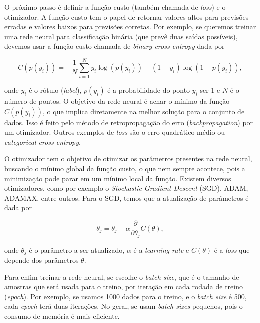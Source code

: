 \documentclass[a4paper,12pt,oneside]{book}
\begin{document}
\par O próximo passo é definir a função custo (também chamada de \textit{loss}) e o otimizador. A função custo tem o papel de retornar valores altos para previsões erradas e valores baixos para previsões corretas. Por exemplo, se queremos treinar uma rede neural para classificação binária (que prevê duas saídas possíveis), devemos usar a função custo chamada de \textit{binary cross-entropy} dada por\cite{dl_book}

\begin{equation}\label{eq:binary_cross_entropy}
    C(p(y_i)) = -\frac{1}{N}\sum_{i = 1} ^N y_i \log(p(y_i)) + (1 - y_i)\log(1 - p(y_i)),
\end{equation}

\par onde $y_i$ é o rótulo (\textit{label}), $p(y_i)$ é a probabilidade do ponto $y_i$ ser 1 e $N$ é o número de pontos. O objetivo da rede neural é achar o mínimo da função $C(p(y_i))$, o que implica diretamente na melhor solução para o conjunto de dados. Isso é feito pelo método de retropropagação do erro (\textit{backpropagation}\cite{backpropagation}) por um otimizador. Outros exemplos de \textit{loss} são o erro quadrático médio ou \textit{categorical cross-entropy}\cite{MSE_CEF_review}.

\par O otimizador tem o objetivo de otimizar os parâmetros presentes na rede neural, buscando o mínimo global da função custo, o que nem sempre acontece, pois a minimização pode parar em um mínimo local da função. Existem diversos otimizadores, como por exemplo o \textit{Stochastic Gradient Descent} (SGD), ADAM, ADAMAX\cite{ADAMAX}, entre outros\cite{gradient_over}. Para o SGD, temos que a atualização de parâmetros é dada por

\begin{equation}\label{eq:SGD}
    \theta_j = \theta_{j} - \alpha \frac{\partial }{\partial \theta_j}C(\theta),
\end{equation}

\par onde $\theta_j$ é o parâmetro a ser atualizado, $\alpha$ é a \textit{learning rate} e $C(\theta)$ é a \textit{loss} que depende dos parâmetros $\theta$.

\par Para enfim treinar a rede neural, se escolhe o \textit{batch size}, que é o tamanho de amostras que será usada para o treino, por iteração em cada rodada de treino (\textit{epoch}). Por exemplo, se usamos 1000 dados para o treino, e o \textit{batch size} é 500, cada \textit{epoch} terá duas iterações. No geral, se usam \textit{batch sizes} pequenos, pois o consumo de memória é mais eficiente.
\end{document}
